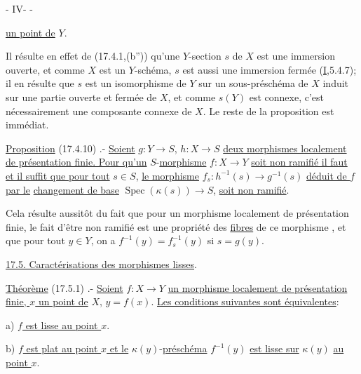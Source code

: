 \begin{center}- IV-  -\end{center}

\uline{un point de} $Y$.

Il résulte en effet de (17.4.1,(b'')) qu'une $Y$-section $s$ de $X$ est une immersion ouverte, et comme $X$ est un $Y$-schéma, $s$ est aussi une  immersion fermée (\uline{I},5.4.7); il en résulte que $s$ est un isomorphisme de $Y$ sur un sous-préschéma de $X$ induit sur une partie ouverte et fermée de $X$, et comme  $s(Y)$ est connexe, c'est nécessairement une composante connexe de $X$. Le reste de la proposition est immédiat.

\uline{Proposition} (17.4.10) .- \uline{Soient} $g:Y\to S$, $h:X\to S$ \uline{deux morphismes localement de présentation finie. Pour qu'un} $S$-\uline{morphisme} $f:X\to Y$ \uline{soit non ramifié il faut et il suffit que pour tout} $s\in S$, \uline{le morphisme} $f_s:h^{-1}(s)\to g^{-1}(s)$ \uline{déduit de $f$ par le}  \uline{changement de base} $\operatorname{Spec}(\kappa(s))\to S$, \uline{soit non ramifié}.

Cela résulte aussitôt du fait que pour un morphisme localement de présentation finie, le fait d'être non ramifié est une propriété des \uline{fibres} de ce morphisme , et  que pour tout $y\in Y$, on a $f^{-1}(y)=f_s^{-1}(y)$ si $s=g(y)$.

\uline{17.5. Caractérisations des morphismes lisses}.

\uline{Théorème} (17.5.1) .- \uline{Soient} $f:X\to Y$ \uline{un morphisme localement de présentation finie, $x$ un point de} $X$, $y=f(x)$. \uline{Les conditions suivantes sont équivalentes}:

a) \uline{$f$ est lisse au point $x$}.

b) \uline{$f$ est plat au point $x$ et le} $\kappa(y)$-\uline{préschéma} $f^{-1}(y)$ \uline{est lisse sur} $\kappa(y)$ \uline{au point $x$}.


